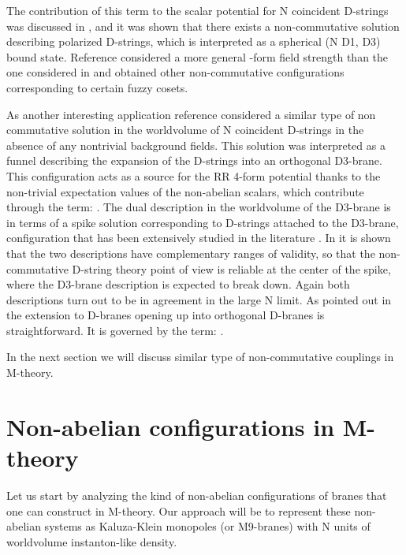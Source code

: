 \documentclass[12pt,a4paper]{article}
\begin{document}
\noindent The contribution of this term to the scalar
potential for N coincident D-strings was discussed in \cite{CMT},
and it was shown that there exists a
non-commutative solution describing polarized D-strings, which is interpreted
as a spherical (N D1, D3) bound state. 
Reference \cite{TV} considered a more general \coordHE{}-form field
strength than the one considered in \cite{Myers} and obtained other
non-commutative configurations corresponding to certain fuzzy cosets.

As another interesting application reference
\cite{CMT} considered a similar type of non commutative solution 
in the worldvolume of N coincident D-strings in the absence of any nontrivial
background fields. This solution was interpreted as a funnel
describing the expansion of the D-strings into an orthogonal D3-brane.
This configuration  
acts as a source for the RR 4-form potential thanks to the
non-trivial expectation values of the non-abelian scalars, which
contribute through the term:
\coordHE{}.
The dual description in the worldvolume of the 
D3-brane is in terms of a spike
solution corresponding to D-strings attached to
the D3-brane, configuration that has been extensively studied in 
the literature \cite{CM}. In
\cite{CMT} it is shown that the two descriptions have complementary 
ranges of validity, 
so that the non-commutative D-string theory point of view
is reliable at the center of the
spike, where the D3-brane description is expected to break down. Again both
descriptions turn out to be in agreement in the large N limit. 
As pointed out in \cite{CMT} the extension to D\coordHE{}-branes opening up
into orthogonal D\coordHE{}-branes is straightforward. It is
governed by the term:
\coordHE{}.

In the next section we will discuss similar type of non-commutative
couplings in M-theory.


\section{Non-abelian configurations in M-theory}

Let us start by analyzing the kind of non-abelian configurations of
branes that one can construct in M-theory. Our approach will be to
represent these non-abelian systems as Kaluza-Klein monopoles
(or M9-branes) with N units of worldvolume instanton-like density.
\end{document}
